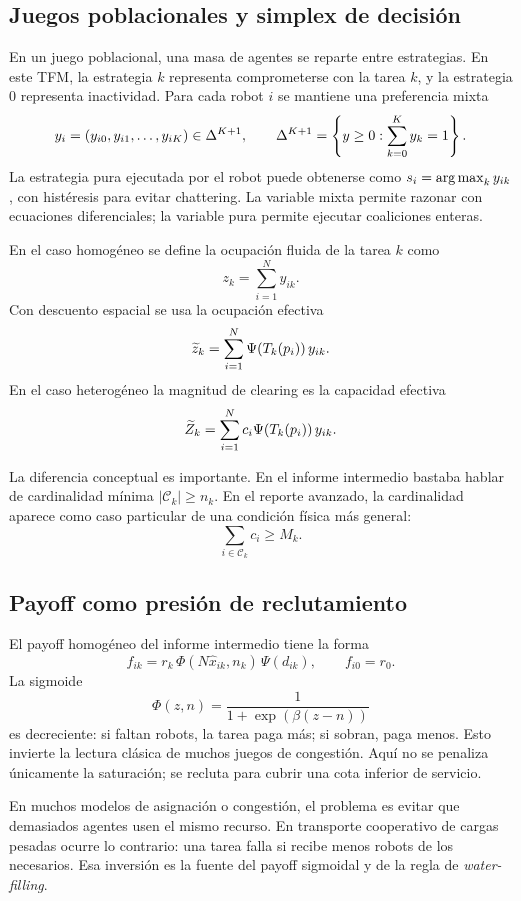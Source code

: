 \subsection{Juegos poblacionales y simplex de decisión}

En un juego poblacional, una masa de agentes se reparte entre estrategias. En este TFM,
la estrategia $k$ representa comprometerse con la tarea $k$, y la estrategia $0$
representa inactividad. Para cada robot $i$ se mantiene una preferencia mixta
\[
  y_i=(y_{i0},y_{i1},\ldots,y_{iK})\in\Delta^{K+1},
  \qquad
  \Delta^{K+1}=\left\{y\ge0:\sum_{k=0}^K y_k=1\right\}.
\]
La estrategia pura ejecutada por el robot puede obtenerse como
$s_i=\operatorname*{arg\,max}_k y_{ik}$, con histéresis para evitar chattering. La variable mixta permite
razonar con ecuaciones diferenciales; la variable pura permite ejecutar coaliciones
enteras.

\begin{definicion}
En el caso homogéneo se define la ocupación fluida de la tarea $k$ como
\[
  z_k=\sum_{i=1}^N y_{ik}.
\]
Con descuento espacial se usa la ocupación efectiva
\[
  \widetilde{z}_k=\sum_{i=1}^N \Psi(T_k(p_i))\,y_{ik}.
\]
En el caso heterogéneo la magnitud de clearing es la capacidad efectiva
\[
  \widetilde{Z}_k=\sum_{i=1}^N c_i\Psi(T_k(p_i))\,y_{ik}.
\]
\end{definicion}

La diferencia conceptual es importante. En el informe intermedio bastaba hablar de
cardinalidad mínima $|\mathcal{C}_k|\ge n_k$. En el reporte avanzado, la cardinalidad
aparece como caso particular de una condición física más general:
\[
  \sum_{i\in\mathcal{C}_k} c_i\ge M_k.
\]

\subsection{Payoff como presión de reclutamiento}

El payoff homogéneo del informe intermedio tiene la forma
\[
  f_{ik}=r_k\,\Phi(N\hat{x}_{ik},n_k)\,\Psi(d_{ik}),
  \qquad
  f_{i0}=r_0.
\]
La sigmoide
\[
  \Phi(z,n)=\frac{1}{1+\exp(\beta(z-n))}
\]
es decreciente: si faltan robots, la tarea paga más; si sobran, paga menos. Esto invierte
la lectura clásica de muchos juegos de congestión. Aquí no se penaliza únicamente la
saturación; se recluta para cubrir una cota inferior de servicio.

\begin{observacion}
En muchos modelos de asignación o congestión, el problema es evitar que demasiados
agentes usen el mismo recurso. En transporte cooperativo de cargas pesadas ocurre lo
contrario: una tarea falla si recibe menos robots de los necesarios. Esa inversión es
la fuente del payoff sigmoidal y de la regla de \emph{water-filling}.
\end{observacion}

